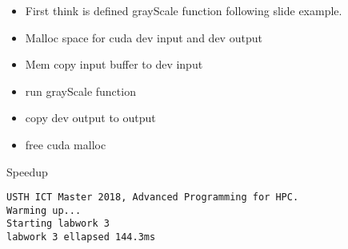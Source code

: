 \documentclass{article}
\begin{document}
\begin{itemize}
    \item First think is defined grayScale function following slide example.
    \item Malloc space for cuda dev input and dev output
    \item Mem copy input buffer to dev input
    \item run grayScale function
    \item copy dev output to output
    \item free cuda malloc
\end{itemize}

Speedup
\begin{verbatim}
USTH ICT Master 2018, Advanced Programming for HPC.
Warming up...
Starting labwork 3
labwork 3 ellapsed 144.3ms
\end{verbatim}
\end{document}
